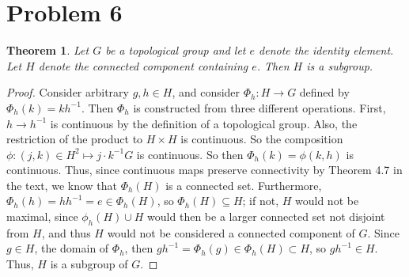 \documentclass{article}
\newtheorem{theorem}[subsection]{Theorem}
\theoremstyle{definition}
\begin{document}
\section{Problem 6}
\begin{theorem}
Let $G$ be a topological group and let $e$ denote the identity element. 
Let $H$ denote the connected component containing $e$. Then $H$ is a 
subgroup.
\end{theorem}
\begin{proof}
Consider arbitrary $g, h \in H$, and consider $\Phi_h : H \to G$ defined
by $\Phi_h ( k ) = kh^{-1}$. Then $\Phi_h$ is constructed from three 
different operations. First, $h \to h^{-1}$ is continuous by the definition
of a topological group. Also, the restriction of the product to $H \times H$
is continuous. So the composition $\phi : (j,k) \in H^2 \mapsto j \cdot k^{-1}G$ 
is continuous. So then $\Phi_h (k) = \phi(k,h)$ is continuous. Thus, since
continuous maps preserve connectivity by Theorem 4.7 in the text, we know that
$\Phi_h(H)$ is a connected set. Furthermore, 
$\Phi_h(h) = h h^{-1} = e \in \Phi_h(H)$,
so $\Phi_h(H) \subseteq H$; if not, $H$ would not be maximal, since 
$\phi_h(H) \cup H$ would then be a larger connected set not disjoint from $H$, 
and thus $H$ would not be considered a connected component of $G$. Since 
$g \in H$, the domain of $\Phi_h$, then 
$gh^{-1} = \Phi_h (g) \in \Phi_h (H) \subset H$, so $gh^{-1} \in H$. Thus,
$H$ is a subgroup of $G$.
\end{proof}
\end{document}
